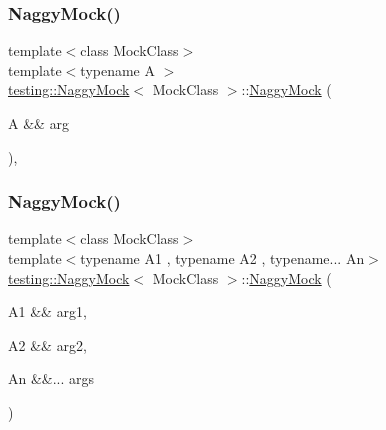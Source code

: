 \mbox{\label{classtesting_1_1_naggy_mock_aab67cd9f71451f89e5fc8938815119ea}} 
\subsubsection{\texorpdfstring{NaggyMock()}{NaggyMock()}\hspace{0.1cm}{\footnotesize\ttfamily [2/17]}}
{\footnotesize\ttfamily template$<$class Mock\+Class$>$ \\
template$<$typename A $>$ \\
\mbox{\hyperlink{classtesting_1_1_naggy_mock}{testing\+::\+Naggy\+Mock}}$<$ Mock\+Class $>$\+::\mbox{\hyperlink{classtesting_1_1_naggy_mock}{Naggy\+Mock}} (\begin{DoxyParamCaption}\item[{A \&\&}]{arg }\end{DoxyParamCaption})\hspace{0.3cm}{\ttfamily [inline]}, {\ttfamily [explicit]}}

\mbox{\label{classtesting_1_1_naggy_mock_a0169b9eb645d153991fa975c65074179}} 
\subsubsection{\texorpdfstring{NaggyMock()}{NaggyMock()}\hspace{0.1cm}{\footnotesize\ttfamily [3/17]}}
{\footnotesize\ttfamily template$<$class Mock\+Class$>$ \\
template$<$typename A1 , typename A2 , typename... An$>$ \\
\mbox{\hyperlink{classtesting_1_1_naggy_mock}{testing\+::\+Naggy\+Mock}}$<$ Mock\+Class $>$\+::\mbox{\hyperlink{classtesting_1_1_naggy_mock}{Naggy\+Mock}} (\begin{DoxyParamCaption}\item[{A1 \&\&}]{arg1,  }\item[{A2 \&\&}]{arg2,  }\item[{An \&\&...}]{args }\end{DoxyParamCaption})\hspace{0.3cm}{\ttfamily [inline]}}

